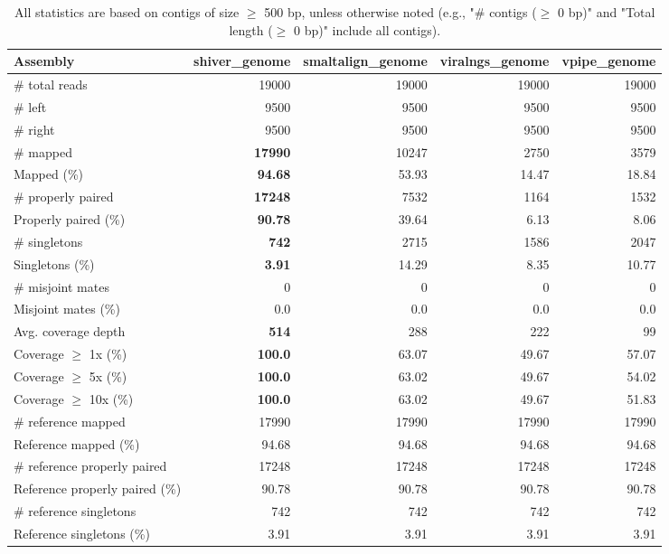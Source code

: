 \documentclass[12pt,a4paper]{article}
\begin{document}
\begin{table}[ht]
\begin{center}
\caption{All statistics are based on contigs of size $\geq$ 500 bp, unless otherwise noted (e.g., "\# contigs ($\geq$ 0 bp)" and "Total length ($\geq$ 0 bp)" include all contigs).}
\begin{tabular}{|l*{4}{|r}|}
\hline
Assembly & shiver\_genome & smaltalign\_genome & viralngs\_genome & vpipe\_genome \\ \hline
\# total reads & 19000 & 19000 & 19000 & 19000 \\ \hline
\# left & 9500 & 9500 & 9500 & 9500 \\ \hline
\# right & 9500 & 9500 & 9500 & 9500 \\ \hline
\# mapped & {\bf 17990} & 10247 & 2750 & 3579 \\ \hline
Mapped (\%) & {\bf 94.68} & 53.93 & 14.47 & 18.84 \\ \hline
\# properly paired & {\bf 17248} & 7532 & 1164 & 1532 \\ \hline
Properly paired (\%) & {\bf 90.78} & 39.64 & 6.13 & 8.06 \\ \hline
\# singletons & {\bf 742} & 2715 & 1586 & 2047 \\ \hline
Singletons (\%) & {\bf 3.91} & 14.29 & 8.35 & 10.77 \\ \hline
\# misjoint mates & 0 & 0 & 0 & 0 \\ \hline
Misjoint mates (\%) & 0.0 & 0.0 & 0.0 & 0.0 \\ \hline
Avg. coverage depth & {\bf 514} & 288 & 222 & 99 \\ \hline
Coverage $\geq$ 1x (\%) & {\bf 100.0} & 63.07 & 49.67 & 57.07 \\ \hline
Coverage $\geq$ 5x (\%) & {\bf 100.0} & 63.02 & 49.67 & 54.02 \\ \hline
Coverage $\geq$ 10x (\%) & {\bf 100.0} & 63.02 & 49.67 & 51.83 \\ \hline
\# reference mapped & 17990 & 17990 & 17990 & 17990 \\ \hline
Reference mapped (\%) & 94.68 & 94.68 & 94.68 & 94.68 \\ \hline
\# reference properly paired & 17248 & 17248 & 17248 & 17248 \\ \hline
Reference properly paired (\%) & 90.78 & 90.78 & 90.78 & 90.78 \\ \hline
\# reference singletons & 742 & 742 & 742 & 742 \\ \hline
Reference singletons (\%) & 3.91 & 3.91 & 3.91 & 3.91 \\ \hline

\end{tabular}
\end{center}
\end{table}
\end{document}
